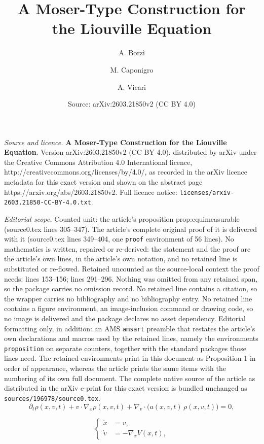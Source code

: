 \documentclass[10pt,a4paper]{amsart}
\title{\textbf{A Moser-Type Construction for the Liouville Equation}}
\author{A. Borz\`i \and M. Caponigro \and A. Vicari}
\date{Source: arXiv:2603.21850v2 (CC BY 4.0)}
\begin{document}
\maketitle

\noindent\emph{Source and licence.} \textbf{A Moser-Type Construction for the Liouville Equation}. Version arXiv:2603.21850v2 (CC BY 4.0), distributed by arXiv under the Creative Commons Attribution 4.0 International licence, http://creativecommons.org/licenses/by/4.0/, as recorded in the arXiv licence metadata for this exact version and shown on the abstract page https://arxiv.org/abs/2603.21850v2. Full licence notice: \texttt{licenses/arxiv-2603.21850-CC-BY-4.0.txt}.\par\smallskip

\noindent\textit{Editorial scope.} Counted unit: the article's proposition prop:equimeasurable (source0.tex lines 305--347). The article's complete original proof of it is delivered with it (source0.tex lines 349--404, one \texttt{proof} environment of 56 lines). No mathematics is written, repaired or re-derived: the statement and the proof are the article's own lines, in the article's own notation, and no retained line is substituted or re-flowed.  Retained uncounted as the source-local context the proof needs: lines 153--156; lines 291--296.  Nothing was omitted from any retained span, so the package carries no omission record.  No retained line contains a citation, so the wrapper carries no bibliography and no bibliography entry.  No retained line contains a figure environment, an image-inclusion command or drawing code, so no image is delivered and the package declares no asset dependency.  Editorial formatting only, in addition: an AMS \texttt{amsart} preamble that restates the article's own declarations and macros used by the retained lines, namely the environments \texttt{proposition} on separate counters, together with the standard packages those lines need.  The retained environments print in this document as Proposition 1 in order of appearance, whereas the article prints the same items with the numbering of its own full document.  The complete native source of the article as distributed in the arXiv e-print for this exact version is bundled unchanged as \texttt{sources/196978/source0.tex}.
\begin{equation}\label{eqLiouville}
\partial_t \rho(x,v,t) + v\cdot\nabla_x \rho(x,v,t)  
+  \nabla_v \cdot \big( a(x,v,t) \, \rho(x,v,t)  \big)= 0, 
\end{equation}

\begin{equation}\label{eq:hamtimedep}
\begin{cases}
\dot x &=v,\\
\dot v &=-\nabla_x V(x,t),
\end{cases}
\end{equation}
\end{document}
